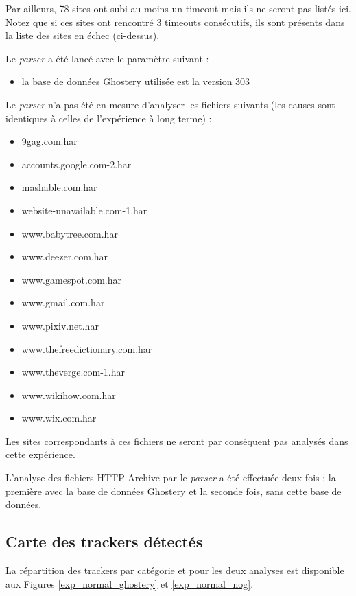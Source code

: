 Par ailleurs, 78 sites ont subi au moins un timeout mais ils ne seront pas listés ici. Notez que si ces sites ont rencontré 3 timeouts consécutifs, ils sont présents dans la liste des sites en échec (ci-dessus).
\newline

Le \textit{parser} a été lancé avec le paramètre suivant :
\begin{itemize}
	\item la base de données Ghostery utilisée est la version 303
	\newline
\end{itemize}

Le \textit{parser} n'a pas été en mesure d'analyser les fichiers suivants (les causes sont identiques à celles de l'expérience à long terme) :
\begin{multicols}{2}
\begin{itemize}
  \item 9gag.com.har
  \item accounts.google.com-2.har
  \item mashable.com.har
  \item website-unavailable.com-1.har
  \item www.babytree.com.har
  \item www.deezer.com.har
  \item www.gamespot.com.har
  \item www.gmail.com.har
  \item www.pixiv.net.har
  \item www.thefreedictionary.com.har
  \item www.theverge.com-1.har
  \item www.wikihow.com.har
  \item www.wix.com.har
\end{itemize}
\end{multicols}

Les sites correspondants à ces fichiers ne seront par conséquent pas analysés dans cette expérience.
\newline

L'analyse des fichiers HTTP Archive par le \textit{parser} a été effectuée deux fois : la première avec la base de données Ghostery et la seconde fois, sans cette base de données.

\subsection{Carte des trackers détectés}
La répartition des trackers par catégorie et pour les deux analyses est disponible aux Figures \ref{exp_normal_ghostery} et \ref{exp_normal_nog}.

